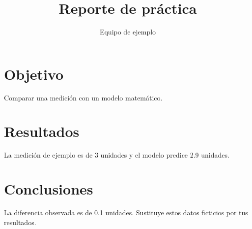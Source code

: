 \documentclass[12pt]{article}
\title{Reporte de práctica}
\author{Equipo de ejemplo}
\date{}
\begin{document}
\maketitle
\section{Objetivo}
Comparar una medición con un modelo matemático.

\section{Resultados}
La medición de ejemplo es de 3 unidades y el modelo predice 2.9 unidades.
\section{Conclusiones}
La diferencia observada es de 0.1 unidades. Sustituye estos datos ficticios por tus resultados.
\end{document}
